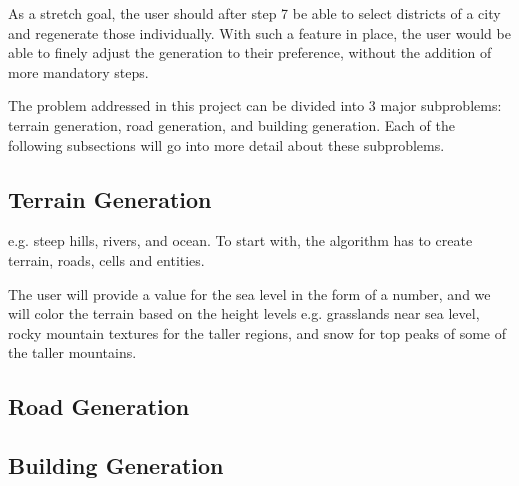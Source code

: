 As a stretch goal, the user should after step 7 be able to select districts of a
city and regenerate those individually. With such a feature in place, the user
would be able to finely adjust the generation to their preference, without the addition of
more mandatory steps.

The problem addressed in this project can be divided into 3 major subproblems:
terrain generation, road generation, and building generation.
Each of the following subsections will go into more detail about these subproblems.

\subsection{Terrain Generation}

e.g. steep hills, rivers, and ocean.
To start with, the algorithm has to create terrain, roads, cells and entities. 

The user will provide a value for the sea level in the form of a number, and we will color the terrain based on the height levels e.g. grasslands near sea level, rocky mountain textures for the taller regions, and snow for top peaks of some of the taller mountains.

\subsection{Road Generation}
\subsection{Building Generation}
